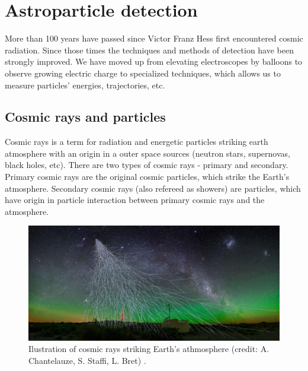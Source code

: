 
\chapter{Astroparticle detection}
More than 100 years have passed since Victor Franz Hess first encountered cosmic radiation. Since those times the techniques and methods of detection have been strongly improved. We have moved up from elevating electroscopes by balloons to observe growing electric charge to specialized techniques, which allows us to measure particles' energies, trajectories, etc.

\section{Cosmic rays and particles}
Cosmic rays is a term for radiation and energetic particles striking earth atmosphere with an origin in a outer space sources (neutron stars, supernovas, black holes, etc). There are two types of cosmic rays - primary and secondary. Primary cosmic rays are the original cosmic particles, which strike the Earth's atmosphere. Secondary cosmic rays (also refereed as showers) are particles, which have origin in particle interaction between primary cosmic rays and the atmosphere.
\par
\begin{figure}[H]
 \centering
 \includegraphics[scale = 0.6]{./pictures/rays}
 \caption{Ilustration of cosmic rays striking Earth's athmosphere (credit: A. Chantelauze, S. Staffi, L. Bret) \cite{intro}.}
 \label{cascade}
 
\end{figure}

